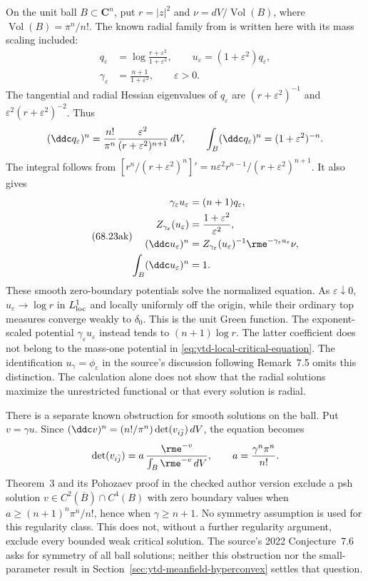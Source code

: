 On the unit ball $B\subset\mathbf C^n$, put $r=|z|^2$ and
$\nu=dV/\operatorname{Vol}(B)$, where
$\operatorname{Vol}(B)=\pi^n/n!$. The known radial family from
\cite[Section~3.3]{BB22MTPublished} is written here with its
mass scaling included:
\[
\tag{68.23aj}\label{eq:ytd-local-critical-ball-family}
\begin{aligned}
 q_\varepsilon&=\log\frac{r+\varepsilon^2}{1+\varepsilon^2},\qquad
 u_\varepsilon=(1+\varepsilon^2)q_\varepsilon,\\
 \gamma_\varepsilon&=\frac{n+1}{1+\varepsilon^2},\qquad\varepsilon>0.
\end{aligned}
\]
The tangential and radial Hessian eigenvalues of $q_\varepsilon$
are $(r+\varepsilon^2)^{-1}$ and
$\varepsilon^2(r+\varepsilon^2)^{-2}$. Thus
\[
 (\ddc q_\varepsilon)^n
   =\frac{n!}{\pi^n}\frac{\varepsilon^2}
             {(r+\varepsilon^2)^{n+1}}\,dV,
 \qquad
 \int_B(\ddc q_\varepsilon)^n=(1+\varepsilon^2)^{-n}.
\]
The integral follows from
$[r^n/(r+\varepsilon^2)^n]'=
n\varepsilon^2r^{n-1}/(r+\varepsilon^2)^{n+1}$.
It also gives
\[
\tag{68.23ak}\label{eq:ytd-local-critical-ball-normalizer}
\begin{aligned}
 \gamma_\varepsilon u_\varepsilon&=(n+1)q_\varepsilon,\\
 Z_{\gamma_\varepsilon}(u_\varepsilon)
     &=\frac{1+\varepsilon^2}{\varepsilon^2},\\
 (\ddc u_\varepsilon)^n
     &=Z_{\gamma_\varepsilon}(u_\varepsilon)^{-1}
            \rme^{-\gamma_\varepsilon u_\varepsilon}\nu,\\
 \int_B(\ddc u_\varepsilon)^n&=1.
\end{aligned}
\]
These smooth zero-boundary potentials solve the normalized equation.
As $\varepsilon\downarrow0$,
$u_\varepsilon\to\log r$ in $L^1_{\rm loc}$ and locally uniformly
off the origin, while their ordinary top measures converge weakly
to $\delta_0$. This is the unit Green function. The exponent-scaled
potential $\gamma_\varepsilon u_\varepsilon$ instead tends to
$(n+1)\log r$. The latter coefficient does not belong to the
mass-one potential in \eqref{eq:ytd-local-critical-equation}.
The identification $u_\gamma=\phi_\varepsilon$ in the source's
discussion following Remark~7.5 omits this distinction.
The calculation alone does not show that the radial solutions
maximize the unrestricted functional or that every solution is radial.

There is a separate known obstruction for smooth solutions on the ball.
Put $v=\gamma u$. Since
$(\ddc v)^n=(n!/\pi^n)\det(v_{i\bar j})\,dV$, the equation becomes
\[
 \det(v_{i\bar j})
     =a\,\frac{\rme^{-v}}{\int_B\rme^{-v}\,dV},\qquad
 a=\frac{\gamma^n\pi^n}{n!}.
\]
Theorem~3 and its Pohozaev proof in the checked author version
\cite{Li14PohozaevAuthor} exclude a psh solution
$v\in C^2(\overline B)\cap C^4(B)$ with zero boundary values
when $a\geq(n+1)^n\pi^n/n!$, hence when $\gamma\geq n+1$.
No symmetry assumption is used for this regularity class.
This does not, without a further regularity argument, exclude every
bounded weak critical solution. The source's 2022 Conjecture~7.6
asks for symmetry of all ball solutions; neither this obstruction
nor the small-parameter result in
Section~\ref{sec:ytd-meanfield-hyperconvex} settles that question.

